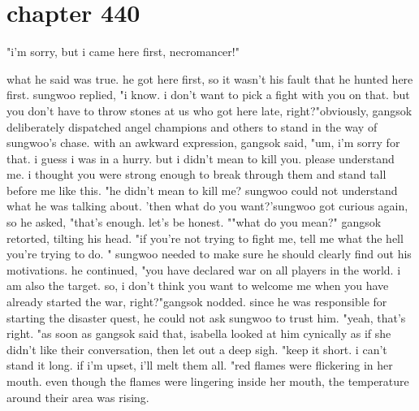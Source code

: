 \section{chapter 440}

"i'm sorry, but i came here first, necromancer!"




what he said was true.
 he got here first, so it wasn't his fault that he hunted here first.
sungwoo replied, "i know.
 i don't want to pick a fight with you on that.
 but you don't have to throw stones at us who got here late, right?"obviously, gangsok deliberately dispatched angel champions and others to stand in the way of sungwoo's chase.
with an awkward expression, gangsok said, "um, i'm sorry for that.
 i guess i was in a hurry.
 but i didn't mean to kill you.
 please understand me.
 i thought you were strong enough to break through them and stand tall before me like this.
"he didn't mean to kill me? sungwoo could not understand what he was talking about.
'then what do you want?'sungwoo got curious again, so he asked, "that's enough.
 let's be honest.
""what do you mean?" gangsok retorted, tilting his head.
"if you're not trying to fight me, tell me what the hell you're trying to do.
" sungwoo needed to make sure he should clearly find out his motivations.
he continued, "you have declared war on all players in the world.
 i am also the target.
 so, i don't think you want to welcome me when you have already started the war, right?"gangsok nodded.
 since he was responsible for starting the disaster quest, he could not ask sungwoo to trust him.
"yeah, that's right.
"as soon as gangsok said that, isabella looked at him cynically as if she didn't like their conversation, then let out a deep sigh.
"keep it short.
 i can't stand it long.
 if i'm upset, i'll melt them all.
"red flames were flickering in her mouth.
 even though the flames were lingering inside her mouth, the temperature around their area was rising.

